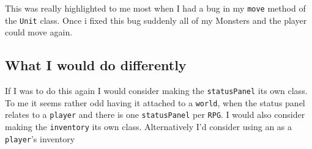 \documentclass[a4paper]{article}
\begin{document}
This was really highlighted to me most when I had a bug in my \texttt{move} method of the \texttt{Unit} class. Once i fixed this bug suddenly all of my Monsters and the player could move again.

\subsection{What I would do differently}
If I was to do this again I would consider making the \texttt{statusPanel} its own class. To me it seems rather odd having it attached to a \texttt{world}, when the status panel relates to a \texttt{player} and there is one \texttt{statusPanel} per \texttt{RPG}.
I would also consider making the \texttt{inventory} its own class. Alternatively I'd consider using an  as a \texttt{player}'s inventory
\end{document}
